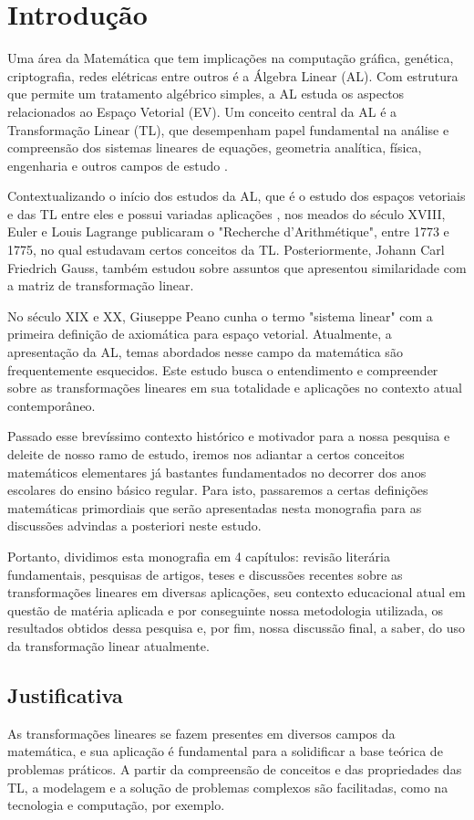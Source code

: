 \chapter{Introdução}
Uma área da Matemática que tem implicações na computação gráfica, genética, criptografia, redes elétricas entre outros é a Álgebra Linear (AL). Com estrutura que permite um tratamento algébrico simples, a AL estuda os aspectos relacionados ao Espaço Vetorial (EV). Um conceito central da AL é a Transformação Linear (TL), que desempenham papel fundamental na análise e compreensão dos sistemas lineares de equações, geometria analítica, física, engenharia e outros campos de estudo \cite{figueiredo2009}. 

Contextualizando o início dos estudos da AL, que é o estudo dos espaços vetoriais e das TL entre eles e possui variadas aplicações \cite{souzasilzaeliza2017}, nos meados do século XVIII, Euler e Louis Lagrange publicaram o "Recherche d'Arithmétique", entre 1773 e 1775, no qual estudavam certos conceitos da TL. Posteriormente, Johann Carl Friedrich Gauss, também estudou sobre assuntos que apresentou similaridade com a matriz de transformação linear.

No século XIX e XX, Giuseppe Peano cunha o termo "sistema linear" com a primeira definição de axiomática para espaço vetorial. Atualmente, a apresentação da AL, temas abordados nesse campo da matemática são frequentemente esquecidos. Este estudo busca o entendimento e compreender sobre as transformações lineares em sua totalidade e aplicações no contexto atual contemporâneo.

Passado esse brevíssimo contexto histórico e motivador para a nossa pesquisa e deleite de nosso ramo de estudo, iremos nos adiantar a certos conceitos matemáticos elementares já bastantes fundamentados no decorrer dos anos escolares do ensino básico regular. Para isto, passaremos a certas definições matemáticas primordiais que serão apresentadas nesta monografia para as discussões advindas a posteriori neste estudo.

Portanto, dividimos esta monografia em 4 capítulos: revisão literária fundamentais, pesquisas de artigos, teses e discussões recentes sobre as transformações lineares em diversas aplicações, seu contexto educacional atual em questão de matéria aplicada e por conseguinte nossa metodologia utilizada, os resultados obtidos dessa pesquisa e, por fim, nossa discussão final, a saber, do uso da transformação linear atualmente.

\section{Justificativa}
As transformações lineares se fazem presentes em diversos campos da matemática, e sua aplicação é fundamental para a solidificar a base teórica de problemas práticos. A partir da compreensão de conceitos e das propriedades das TL, a modelagem e a solução de problemas complexos são facilitadas, como na tecnologia e computação, por exemplo. 

